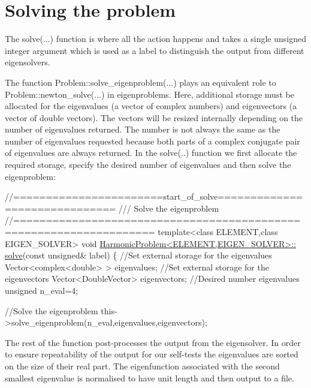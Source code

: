  

\hypertarget{index_solve}{}\section{Solving the problem}\label{index_solve}
The {\ttfamily solve}(...) function is where all the action happens and takes a single unsigned integer argument which is used as a label to distinguish the output from different eigensolvers.

The function {\ttfamily Problem\+::solve\+\_\+eigenproblem}(...) plays an equivalent role to {\ttfamily Problem\+::newton\+\_\+solve}(...) in eigenproblems. Here, additional storage must be allocated for the eigenvalues (a vector of complex numbers) and eigenvectors (a vector of double vectors). The vectors will be resized internally depending on the number of eigenvalues returned. The number is not always the same as the number of eigenvalues requested because both parts of a complex conjugate pair of eigenvalues are always returned. In the {\ttfamily solve}(..) function we first allocate the required storage, specify the desired number of eigenvalues and then solve the eigenproblem\+:


\begin{DoxyCodeInclude}
\textcolor{comment}{//=======================start\_of\_solve==============================}
\textcolor{comment}{/// Solve the eigenproblem }
\textcolor{comment}{}\textcolor{comment}{//===================================================================}
\textcolor{keyword}{template}<\textcolor{keyword}{class} ELEMENT,\textcolor{keyword}{class} EIGEN\_SOLVER>
\textcolor{keywordtype}{void} \hyperlink{classHarmonicProblem_aba2b3fd58a67f03ca0481e426d385c5d}{HarmonicProblem<ELEMENT,EIGEN\_SOLVER>::}
\hyperlink{classHarmonicProblem_aba2b3fd58a67f03ca0481e426d385c5d}{solve}(\textcolor{keyword}{const} \textcolor{keywordtype}{unsigned}& label)
\{ 
 \textcolor{comment}{//Set external storage for the eigenvalues}
 Vector<complex<double> > eigenvalues;
 \textcolor{comment}{//Set external storage for the eigenvectors}
 Vector<DoubleVector> eigenvectors;
 \textcolor{comment}{//Desired number eigenvalues}
 \textcolor{keywordtype}{unsigned} n\_eval=4;

 \textcolor{comment}{//Solve the eigenproblem}
 this->solve\_eigenproblem(n\_eval,eigenvalues,eigenvectors);

\end{DoxyCodeInclude}


The rest of the function post-\/processes the output from the eigensolver. In order to ensure repeatability of the output for our self-\/tests the eigenvalues are sorted on the size of their real part. The eigenfunction associated with the second smallest eigenvalue is normalised to have unit length and then output to a file.

